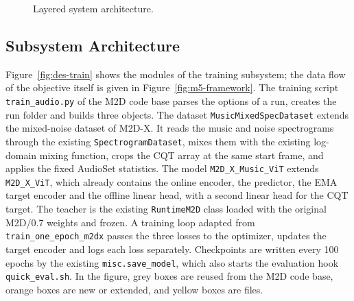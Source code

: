 \documentclass{FastFyp}
\begin{document}
\begin{figure}[htbp]
{}
\caption[Layered system architecture]{Layered system architecture.}
\label{fig:des-layers}
\end{figure}

\subsection{Subsystem Architecture}
Figure~\ref{fig:des-train} shows the modules of the training subsystem; the data flow of the objective itself is given in Figure~\ref{fig:m5-framework}. The training script \texttt{train\_audio.py} of the M2D code base parses the options of a run, creates the run folder and builds three objects. The dataset \texttt{MusicMixedSpecDataset} extends the mixed-noise dataset of M2D-X. It reads the music and noise spectrograms through the existing \texttt{SpectrogramDataset}, mixes them with the existing log-domain mixing function, crops the CQT array at the same start frame, and applies the fixed AudioSet statistics. The model \texttt{M2D\_X\_Music\_ViT} extends \texttt{M2D\_X\_ViT}, which already contains the online encoder, the predictor, the EMA target encoder and the offline linear head, with a second linear head for the CQT target. The teacher is the existing \texttt{RuntimeM2D} class loaded with the original M2D/0.7 weights and frozen. A training loop adapted from \texttt{train\_one\_epoch\_m2dx} passes the three losses to the optimizer, updates the target encoder and logs each loss separately. Checkpoints are written every 100 epochs by the existing \texttt{misc.save\_model}, which also starts the evaluation hook \texttt{quick\_eval.sh}. In the figure, grey boxes are reused from the M2D code base, orange boxes are new or extended, and yellow boxes are files.
\end{document}

